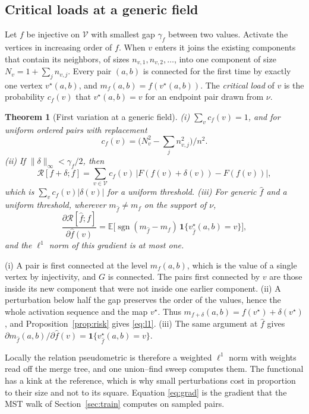 \documentclass[10pt,conference]{IEEEtran}
\newtheorem{theorem}{Theorem}
\newcommand{\E}{\mathbb E}
\begin{document}
\subsection{Critical loads at a generic field}
Let $f$ be injective on $\mathcal V$ with smallest gap $\gamma_f$ between two values. Activate the vertices in increasing order of $f$. When $v$ enters it joins the existing components that contain its neighbors, of sizes $n_{v,1},n_{v,2},\dots$, into one component of size $N_v=1+\sum_jn_{v,j}$. Every pair $(a,b)$ is connected for the first time by exactly one vertex $v^\star(a,b)$, and $m_f(a,b)=f(v^\star(a,b))$. The \emph{critical load} of $v$ is the probability $c_f(v)$ that $v^\star(a,b)=v$ for an endpoint pair drawn from $\nu$.
\begin{theorem}[First variation at a generic field]\label{thm:loads}
(i) $\sum_vc_f(v)=1$, and for uniform ordered pairs with replacement
\begin{equation}
 c_f(v)=\big(N_v^2-\textstyle\sum_jn_{v,j}^2\big)/n^2 . \label{eq:load}
\end{equation}
(ii) If $\|\delta\|_\infty<\gamma_f/2$, then
\begin{equation}
 \mathcal R[f+\delta;f]=\sum_{v\in\mathcal V}c_f(v)\,\big|F(f(v)+\delta(v))-F(f(v))\big|, \label{eq:l1}
\end{equation}
which is $\sum_vc_f(v)|\delta(v)|$ for a uniform threshold. (iii) For generic $\hat f$ and a uniform threshold, wherever $m_{\hat f}\ne m_f$ on the support of $\nu$,
\begin{equation}
 \frac{\partial\mathcal R[\hat f;f]}{\partial\hat f(v)}=\E\big[\operatorname{sgn}(m_{\hat f}-m_f)\,\mathbf 1\{v^\star_{\hat f}(a,b)=v\}\big], \label{eq:grad}
\end{equation}
and the $\ell^1$ norm of this gradient is at most one.
\end{theorem}
\begin{IEEEproof}
(i) A pair is first connected at the level $m_f(a,b)$, which is the value of a single vertex by injectivity, and $G$ is connected. The pairs first connected by $v$ are those inside its new component that were not inside one earlier component. (ii) A perturbation below half the gap preserves the order of the values, hence the whole activation sequence and the map $v^\star$. Thus $m_{f+\delta}(a,b)=f(v^\star)+\delta(v^\star)$, and Proposition~\ref{prop:risk} gives \eqref{eq:l1}. (iii) The same argument at $\hat f$ gives $\partial m_{\hat f}(a,b)/\partial\hat f(v)=\mathbf 1\{v^\star_{\hat f}(a,b)=v\}$.
\end{IEEEproof}
Locally the relation pseudometric is therefore a weighted $\ell^1$ norm with weights read off the merge tree, and one union--find sweep computes them. The functional has a kink at the reference, which is why small perturbations cost in proportion to their size and not to its square. Equation \eqref{eq:grad} is the gradient that the MST walk of Section~\ref{sec:train} computes on sampled pairs.
\end{document}
